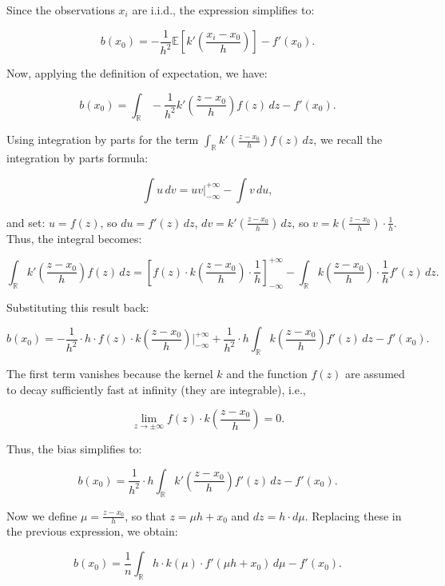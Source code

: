 \documentclass{article}
\begin{document}
Since the observations \( x_i \) are i.i.d., the expression simplifies to:

\[
b(x_0) = -\frac{1}{h^2} \mathbb{E}\left[k'\left(\frac{x_i - x_0}{h}\right)\right] - f'(x_0).
\]

Now, applying the definition of expectation, we have:

\[
b(x_0) = \int_{\mathbb{R}} -\frac{1}{h^2} k'\left(\frac{z - x_0}{h}\right) f(z) \, dz - f'(x_0).
\]

Using integration by parts for the term \(\int_{\mathbb{R}} k'\left(\frac{z - x_0}{h}\right) f(z) \, dz\), we recall the integration by parts formula:

\[
\int u \, dv = uv \Big|_{-\infty}^{+\infty} - \int v \, du,
\]

and set: \( u = f(z) \), so \( du = f'(z) \, dz \), \( dv = k'\left(\frac{z - x_0}{h}\right) \, dz \), so \( v = k\left(\frac{z - x_0}{h}\right) \cdot \frac{1}{h} \). \\

Thus, the integral becomes:

\[
\int_{\mathbb{R}} k'\left(\frac{z - x_0}{h}\right) f(z) \, dz = \left[f(z) \cdot k\left(\frac{z - x_0}{h}\right) \cdot \frac{1}{h}\right]_{-\infty}^{+\infty} - \int_{\mathbb{R}} k\left(\frac{z - x_0}{h}\right) \cdot \frac{1}{h} f'(z) \, dz.
\]

Substituting this result back:

\[
b(x_0) = -\frac{1}{h^2} \cdot h \cdot f(z) \cdot k\left(\frac{z - x_0}{h}\right) \Big|_{-\infty}^{+\infty} + \frac{1}{h^2} \cdot h \int_{\mathbb{R}} k\left(\frac{z - x_0}{h}\right) f'(z) \, dz - f'(x_0).
\]

The first term vanishes because the kernel \( k \) and the function \( f(z) \) are assumed to decay sufficiently fast at infinity (they are integrable), i.e.,

\[
\lim_{z \to \pm\infty} f(z) \cdot k\left(\frac{z - x_0}{h}\right) = 0.
\]

Thus, the bias simplifies to:

\[
b(x_0) = \frac{1}{h^2} \cdot h \int_{\mathbb{R}} k'\left(\frac{z - x_0}{h}\right) f'(z) \, dz - f'(x_0).
\]

Now we define \(\mu = \frac{z - x_0}{h}\), so that \(z = \mu h + x_0\) and \(dz = h \cdot d\mu\). Replacing these in the previous expression, we obtain:

\[
b(x_0) = \frac{1}{n} \int_{\mathbb{R}} h \cdot k(\mu) \cdot f'(\mu h + x_0) \, d\mu - f'(x_0).
\]
\end{document}
